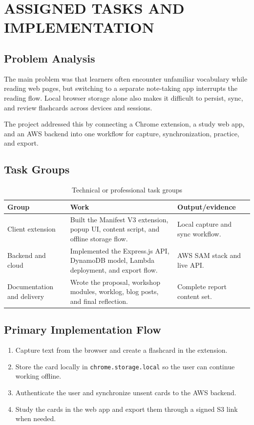 \chapter{ASSIGNED TASKS AND IMPLEMENTATION}

\section{Problem Analysis}

The main problem was that learners often encounter unfamiliar vocabulary while
reading web pages, but switching to a separate note-taking app interrupts the
reading flow. Local browser storage alone also makes it difficult to persist,
sync, and review flashcards across devices and sessions.

The project addressed this by connecting a Chrome extension, a study web app,
and an AWS backend into one workflow for capture, synchronization, practice,
and export.

\section{Task Groups}

\begin{table}[H]
  \centering
  \caption{Technical or professional task groups}
  \begin{tabularx}{\textwidth}{@{}P{3.2cm}YP{3.8cm}@{}}
    \toprule
    \textbf{Group} & \textbf{Work} & \textbf{Output/evidence} \\
    \midrule
    Client extension & Built the Manifest V3 extension, popup UI, content
      script, and offline storage flow. & Local capture and sync workflow. \\
    \addlinespace
    Backend and cloud & Implemented the Express.js API, DynamoDB model,
      Lambda deployment, and export flow. & AWS SAM stack and live API. \\
    \addlinespace
    Documentation and delivery & Wrote the proposal, workshop modules,
      worklog, blog posts, and final reflection. & Complete report content set. \\
    \bottomrule
  \end{tabularx}
\end{table}

\section{Primary Implementation Flow}

\begin{enumerate}
  \item Capture text from the browser and create a flashcard in the extension.
  \item Store the card locally in \texttt{chrome.storage.local} so the user can
  continue working offline.
  \item Authenticate the user and synchronize unsent cards to the AWS backend.
  \item Study the cards in the web app and export them through a signed S3
  link when needed.
\end{enumerate}

